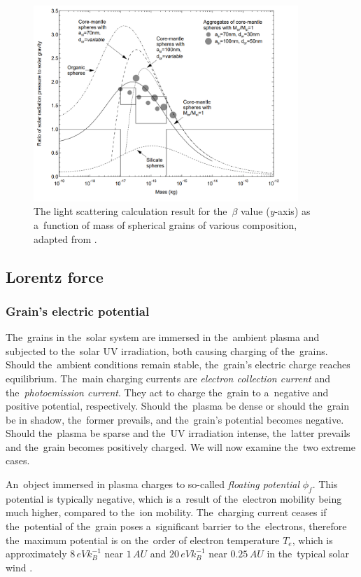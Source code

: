 \begin{figure}[hb]
 	\centering
 	\includegraphics[width=10cm]{figures/kimurra_mie.png}
 	\caption{The light scattering calculation result for the~$\beta$ value (\textit{y}-axis) as a~function of mass of spherical grains of various composition, adapted from \citet{kimura2003composition}.}
 	\label{fig:kimura_mie}
\end{figure}

\subsection{Lorentz force}

\subsubsection{Grain's electric potential}

The~grains in the~solar system are immersed in the~ambient plasma and subjected to the~solar UV irradiation, both causing charging of the~grains. Should the~ambient conditions remain stable, the~grain's electric charge reaches equilibrium. The~main charging currents are \textit{electron collection current} and the~\textit{photoemission current}. They act to charge the~grain to a~negative and positive potential, respectively. Should the~plasma be dense or should the~grain be in shadow, the~former prevails, and the~grain's potential becomes negative. Should the~plasma be sparse and the~UV irradiation intense, the~latter prevails and the~grain becomes positively charged. We will now examine the~two extreme cases. 

An~object immersed in plasma charges to so-called \textit{floating potential} $\phi_{f}$. This potential is typically negative, which is a~result of the~electron mobility being much higher, compared to the~ion mobility. The~charging current ceases if the~potential of the~grain poses a~significant barrier to the~electrons, therefore the~maximum potential is on the~order of electron temperature $T_e$, which is approximately $8 \, \si{eV k_B^{-1}}$ near $1 \, \si{AU}$ and $20 \, \si{eV k_B^{-1}}$ near $0.25 \, \si{AU}$ in the~typical solar wind \citep{guillemant2013simulation}. 

